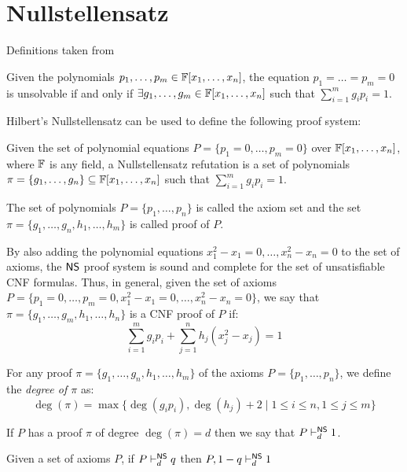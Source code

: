\section{Nullstellensatz}

Definitions taken from \cite{Nullstellensatz}

\begin{definition}
    Given the polynomials $p_1, \ldots, p_m \in \mathbb{F}[x_1, \ldots, x_n]$, the equation $p_1 = \ldots = p_m = 0$ is unsolvable if and only if $\exists g_1, \ldots, g_m \in \mathbb{F}[x_1, \ldots, x_n]$ such that $\sum\limits_{i = 1}^m g_i p_i = 1$.
\end{definition}

Hilbert's Nullstellensatz can be used to define the following proof system:

\begin{definition}
    Given the set of polynomial equations $P = \{p_1 = 0, \ldots, p_m = 0\}$ over $\mathbb{F}[x_1, \ldots, x_n]$, where $\mathbb{F}$ is any field, a Nullstellensatz refutation is a set of polynomials $\pi = \{g_1, \ldots, g_n\} \subseteq \mathbb{F}[x_1, \ldots, x_n]$ such that $\sum\limits_{i = 1}^m g_i p_i = 1$.

    The set of polynomials $P = \{p_1, \ldots, p_n\}$ is called the axiom set and the set $\pi = \{g_1, \ldots, g_n, h_1, \ldots, h_m\}$ is called proof of $P$.
\end{definition}

By also adding the polynomial equations $x_1^2-x_1 = 0, \ldots, x_n^2-x_n = 0$ to the set of axioms, the $\mathsf{NS}$ proof system is sound and complete for the set of unsatisfiable CNF formulas. Thus, in general, given the set of axioms $P = \{p_1 = 0, \ldots, p_m = 0, x_1^2-x_1 = 0, \ldots, x_n^2-x_n = 0\}$, we say that $\pi = \{g_1, \ldots, g_m, h_1, \ldots, h_n\}$ is a CNF proof of $P$ if:
\[\sum_{i = 1}^m g_i p_i + \sum_{j = 1}^n h_j (x_j^2-x_j) = 1\]

For any proof $\pi = \{g_1, \ldots, g_n, h_1, \ldots, h_m\}$ of the axioms $P = \{p_1, \ldots, p_n\}$, we define the \textit{degree of $\pi$} as:
\[\deg(\pi) = \max\{\deg(g_i p_i), \deg(h_j) + 2 \mid 1 \leq i \leq n, 1 \leq j \leq m\}\]

If $P$ has a proof $\pi$ of degree $\deg(\pi) = d$ then we say that $P \vdash^{\mathsf{NS}}_d 1$.

\begin{proposition}
    \label{neg_refutation}
    Given a set of axioms $P$, if $P \vdash^{\mathsf{NS}}_d q$ then $P, 1-q \vdash^{\mathsf{NS}}_d 1$ 
\end{proposition}

